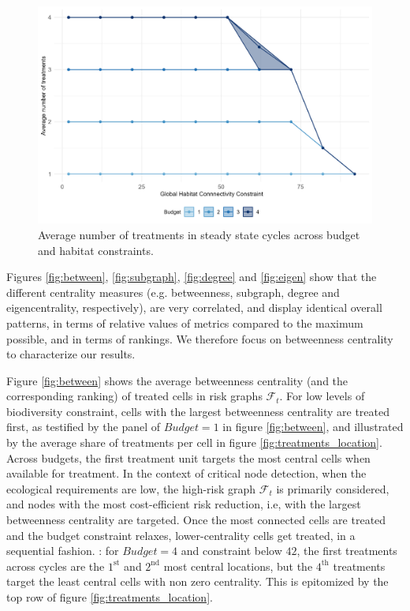 \begin{figure}
     \centering
         \includegraphics[width=.8\textwidth]{figures/wildland/number_treatments.jpg}
         \caption{Average number of treatments in steady state cycles across budget and habitat constraints.}
         \label{fig:treatments_number}
\end{figure}

Figures \ref{fig:between}, \ref{fig:subgraph}, \ref{fig:degree} and \ref{fig:eigen} show that the different centrality measures (e.g. betweenness, subgraph, degree and eigencentrality, respectively), are very correlated, and display identical overall patterns, in terms of relative values of metrics compared to the maximum possible, and in terms of rankings. We therefore focus on betweenness centrality to characterize our results. 

Figure \ref{fig:between} shows the average betweenness centrality (and the corresponding ranking) of treated cells in risk graphs $\mathcal{F}_t$. For low levels of biodiversity constraint, cells with the largest betweenness centrality are treated first, as testified by the panel of $Budget=1$ in figure \ref{fig:between}, and illustrated by the average share of treatments per cell in figure \ref{fig:treatments_location}. Across budgets, the first treatment unit targets the most central cells when available for treatment. In the context of critical node detection, when the ecological requirements are low, the high-risk graph $\mathcal{F}_t$ is primarily considered, and nodes with the most cost-efficient risk reduction, i.e, with the largest betweenness centrality are targeted. Once the most connected cells are treated and the budget constraint relaxes, lower-centrality cells get treated, in a sequential fashion. : for $Budget=4$ and constraint below $42$, the first treatments across cycles are the $1^{\mathrm{st}}$ and $2^{\mathrm{nd}}$ most central locations, but the $4^{\mathrm{th}}$ treatments target the least central cells with non zero centrality. This is epitomized by the top row of figure \ref{fig:treatments_location}.  

